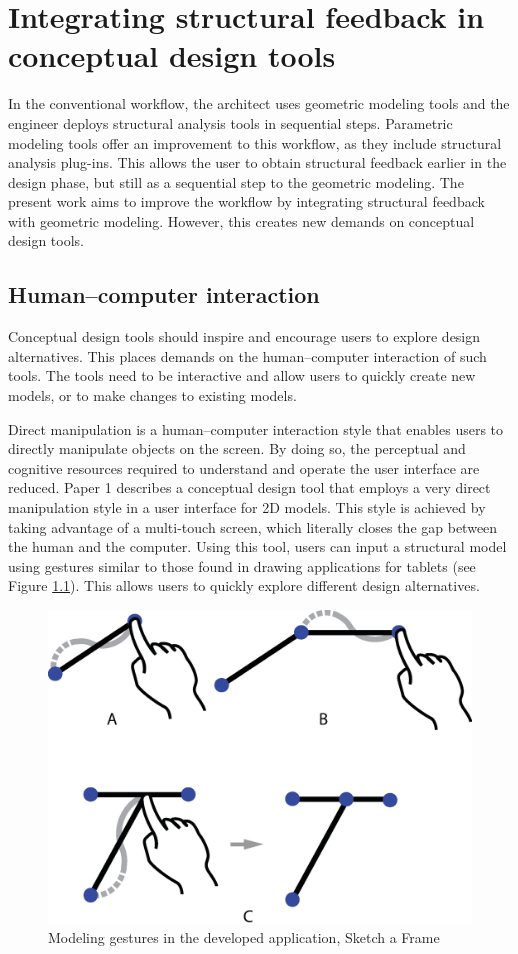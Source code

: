 \chapter{Integrating structural feedback in conceptual design tools}
\label{ch:Integrating structural feedback}
In the conventional workflow, the architect uses geometric modeling tools and the engineer deploys structural analysis tools in sequential steps. Parametric modeling tools offer an improvement to this workflow, as they include structural analysis plug-ins. This allows the user to obtain structural feedback earlier in the design phase, but still as a sequential step to the geometric modeling. The present work aims to improve the workflow by integrating structural feedback with geometric modeling. However, this creates new demands on conceptual design tools. 

\section{Human--computer interaction}
Conceptual design tools should inspire and encourage users to explore design alternatives. This places demands on the human--computer interaction of such tools. The tools need to be interactive and allow users to quickly create new models, or to make changes to existing models. 

Direct manipulation is a human--computer interaction style that enables users to directly manipulate objects on the screen. By doing so, the perceptual and cognitive resources required to understand and operate the user interface are reduced. Paper 1 describes a conceptual design tool that employs a very direct manipulation style in a user interface for 2D models. This style is achieved by taking advantage of a multi-touch screen, which literally closes the gap between the human and the computer. Using this tool, users can input a structural model using gestures similar to those found in drawing applications for tablets (see Figure \ref{fig:interaction}). This allows users to quickly explore different design alternatives.

\begin{figure}
  \includegraphics[width=330pt]{graphics/interaction.eps}
  \caption{Modeling gestures in the developed application, Sketch a Frame}
  \label{fig:interaction}
\end{figure}

